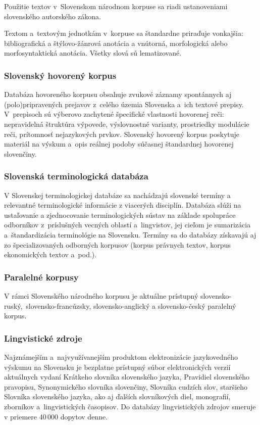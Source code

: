 \begin{multicols}{2}
Použitie textov v Slovenskom národnom korpuse sa riadi ustanoveniami
slovenského autorského zákona. 

Textom a textovým jednotkám v korpuse sa štandardne priraďuje
vonkajšia: bibliografická a štýlovo-žánrová
anotácia\cite{f12} a vnútorná,
morfologická alebo morfosyntaktická
anotácia\cite{f13}. Všetky slová
sú lematizované. 

\subsubsection{Slovenský hovorený korpus}
Databáza hovoreného korpusu\cite{f34} obsahuje zvukové záznamy
spontánnych aj (polo)pripravených prejavov z celého územia
Slovenska a ich textové prepisy. V prepisoch sú výberovo zachytené
špecifické vlastnosti hovorenej reči: nepravidelná štruktúra
výpovede, výslovnostné varianty, prostriedky modulácie reči,
prítomnosť nejazykových prvkov. Slovenský hovorený korpus poskytuje
materiál na výskum a opis reálnej podoby súčasnej štandardnej
hovorenej slovenčiny.

\subsubsection{Slovenská terminologická databáza}
V Slovenskej terminologickej
databáze\cite{f15} sa nachádzajú
slovenské termíny a relevantné terminologické informácie z
viacerých disciplín. Databáza slúži na ustaľovanie a zjednocovanie
terminologických sústav na základe spolupráce odborníkov
z príslušných vecných oblastí a lingvistov, jej cieľom je
sumarizácia a štandardizácia terminológie na Slovensku. Termíny sa
do databázy získavajú aj zo špecializovaných odborných korpusov
(korpus právnych textov, korpus ekonomických textov a pod.).

\subsubsection{Paralelné korpusy}
V rámci Slovenského národného korpusu je aktuálne
prístupný
slovensko-ruský\cite{f16}, slovensko-francúzsky\cite{f17},
slovensko-anglický\cite{f18} a
slovensko-český\cite{f19} paralelný
korpus.

\subsubsection{Lingvistické zdroje}
Najznámejším a najvyužívanejším produktom
elektronizácie jazykovedného výskumu na Slovensku je bezplatne
prístupný súbor elektronických verzií aktuálnych vydaní Krátkeho
slovníka slovenského jazyka, Pravidiel slovenského pravopisu,
Synonymického slovníka slovenčiny, Slovníka cudzích slov,
staršieho Slovníka slovenského
jazyka\cite{f20}, ako aj ďalších
slovníkových diel, monografií, zborníkov a lingvistických
časopisov\cite{f21}. Do databázy
lingvistických zdrojov smeruje v priemere 40\,000 dopytov denne.

\end{multicols}

